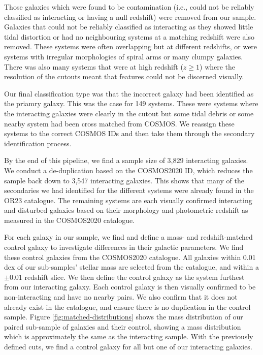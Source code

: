 Those galaxies which were found to be contamination (i.e., could not be reliably classified as interacting or having a null redshift) were removed from our sample. Galaxies that could not be reliably classified as interacting as they showed little tidal distortion or had no neighbouring systems at a matching redshift were also removed. These systems were often overlapping but at different redshifts, or were systems with irregular morphologies of spiral arms or many clumpy galaxies. There was also many systems that were at high redshift ($z \geq 1$) where the resolution of the cutouts meant that features could not be discerned visually.

Our final classification type was that the incorrect galaxy had been identified as the priamry galaxy. This was the case for 149 systems. These were systems where the interacting galaxies were clearly in the cutout but some tidal debris or some nearby system had been cross matched from COSMOS. We reassign these systems to the correct COSMOS IDs and then take them through the secondary identification process.

By the end of this pipeline, we find a sample size of 3,829 interacting galaxies. We conduct a de-duplication based on the COSMOS2020 ID, which reduces the sample back down to 3,547 interacting galaxies. This shows that many of the secondaries we had identified for the different systems were already found in the OR23 catalogue. The remaining systems are each visually confirmed interacting and disturbed galaxies based on their morphology and photometric redshift as measured in the COSMOS2020 catalogue.

For each galaxy in our sample, we find and define a mass- and redshift-matched control galaxy to investigate differences in their galactic parameters. We find these control galaxies from the COSMOS2020 catalogue. All galaxies within 0.01 dex of our sub-samples' stellar mass are selected from the catalogue, and within a $\pm$0.01 redshift slice. We then define the control galaxy as the system furthest from our interacting galaxy. Each control galaxy is then visually confirmed to be non-interacting and have no nearby pairs. We also confirm that it does not already exist in the catalogue, and ensure there is no duplication in the control sample. Figure \ref{fig:matched-distributions} shows the mass distribution of our paired sub-sample of galaxies and their control, showing a mass distribution which is approximately the same as the interacting sample. With the previously defined cuts, we find a control galaxy for all but one of our interacting galaxies.

